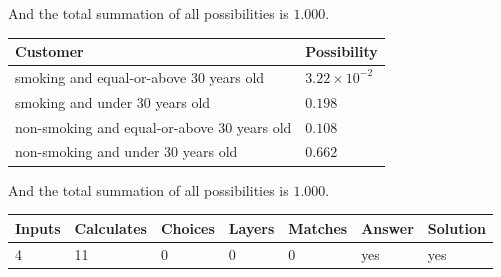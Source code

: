 \documentclass[12pt]{article}
\begin{document}
\noindent
And the total summation of all possibilities is $  %
1.000 $.
 
 
 
 
\noindent{}
 
 

 
 
 
\noindent{}
 
 

 
\noindent
\begin{tabular}{|l|l|}
\hline
Customer & Possibility \\
\hline
smoking  and  %
equal-or-above 30 years old &
  $ %
3.22 \times 10^{-2}$ \\
\hline
smoking  and  %
under 30 years old &
  $ %
0.198$ \\
\hline
 non-smoking and  %
equal-or-above 30 years old &
  $ %
0.108$ \\
\hline
 non-smoking and  %
under 30 years old &
  $ %
0.662$ \\
\hline
\end{tabular}
 
\noindent
 And the total summation of all possibilities is $  %
1.000 $.
 
 
 
\noindent{}
 
 

 
\vspace{0.3in}
   
   
   
   
\noindent\begin{tabular}{|l|l|l|l|l|l|l|}
 \hline
Inputs & Calculates & Choices & Layers & Matches & Answer & Solution \\ \hline
           4  & 
          11  & 
           0
  & 
           0  & 
           0  & 
  yes & 
  yes 
  \\ \hline
 \end{tabular}
   
   
   
   
\noindent{}
   
   
  
\end{document}
